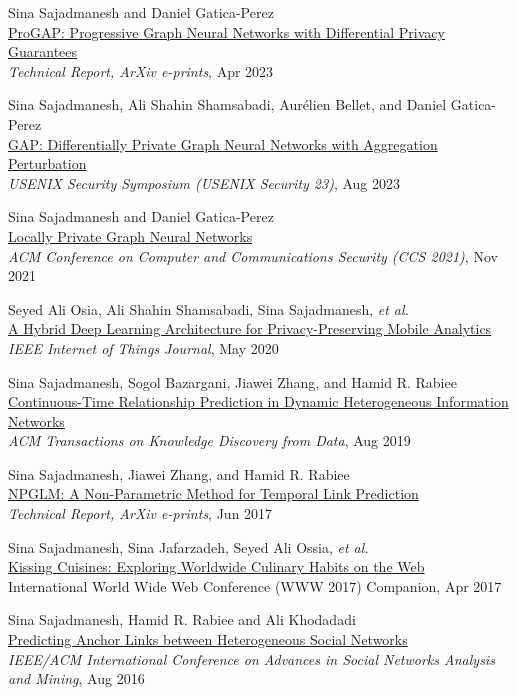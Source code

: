 \documentclass[11pt]{article}
\begin{document}
\begin{enumerate}[label={[\arabic*]}, leftmargin=15pt]
	\item {Sina Sajadmanesh} and Daniel Gatica-Perez\\
	\href{https://arxiv.org/abs/2304.08928}{{ProGAP: Progressive Graph Neural Networks with Differential Privacy Guarantees}}\\
	\textit{Technical Report, ArXiv e-prints}, Apr 2023

	\item {Sina Sajadmanesh}, Ali Shahin Shamsabadi, Aurélien Bellet, and Daniel Gatica-Perez\\
	\href{https://arxiv.org/abs/2203.00949}{{GAP: Differentially Private Graph Neural Networks with Aggregation Perturbation}}\\
	\textit{USENIX Security Symposium (USENIX Security 23)}, Aug 2023

	\item {Sina Sajadmanesh} and Daniel Gatica-Perez\\
	\href{https://arxiv.org/abs/2006.05535}{{Locally Private Graph Neural Networks}}\\
	\textit{ACM Conference on Computer and Communications Security (CCS 2021)}, Nov 2021

	\item Seyed Ali Osia, Ali Shahin Shamsabadi, {Sina Sajadmanesh}, \textit{et al.}\\
	\href{https://arxiv.org/abs/1703.02952}{{A Hybrid Deep Learning Architecture for Privacy-Preserving Mobile Analytics}}\\
	\textit{IEEE Internet of Things Journal}, May 2020

	\item {Sina Sajadmanesh}, Sogol Bazargani, Jiawei Zhang, and Hamid R. Rabiee\\
	\href{https://arxiv.org/abs/1710.00818}{{Continuous-Time Relationship Prediction in Dynamic Heterogeneous Information Networks}}\\
	\textit{ACM Transactions on Knowledge Discovery from Data}, Aug 2019

	\item {Sina Sajadmanesh}, Jiawei Zhang, and Hamid R. Rabiee\\
	\href{https://arxiv.org/abs/1706.06783}{{NPGLM: A Non-Parametric Method for Temporal Link Prediction}}\\
	\textit{Technical Report, ArXiv e-prints}, Jun 2017

	\item {Sina Sajadmanesh}, Sina Jafarzadeh, Seyed Ali Ossia, \textit{et al.}\\
	\href{https://arxiv.org/pdf/1610.08469}{{Kissing Cuisines: Exploring Worldwide Culinary Habits on the Web}}\\
	International World Wide Web Conference (WWW 2017) Companion, Apr 2017

	\item {Sina Sajadmanesh}, Hamid R. Rabiee and Ali Khodadadi\\
	\href{https://arxiv.org/pdf/1607.08821}{{Predicting Anchor Links between Heterogeneous Social Networks}}\\
	\textit{IEEE/ACM International Conference on Advances in Social Networks Analysis and Mining},  Aug 2016

\end{enumerate}
\end{document}
